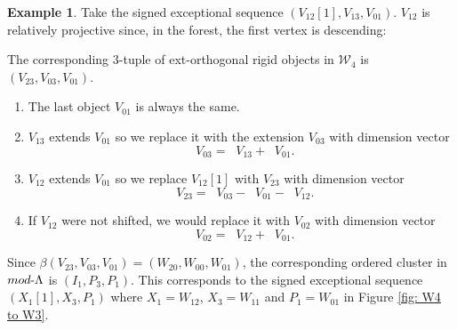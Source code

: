 \documentclass[11pt]{amsart}
\theoremstyle{definition}
\newtheorem{eg}[thm]{Example}
\theoremstyle{remark}
\numberwithin{equation}{section}
\DeclareMathOperator{\undim}{\underline{dim}}
\newcommand{\cW}{\ensuremath{{\mathcal{W}}}}
\begin{document}
\begin{eg}
Take the signed exceptional sequence $(V_{12}[1],V_{13},V_{01})$. $V_{12}$ is relatively projective since, in the forest, the first vertex is descending:
\begin{center}
\end{center}
The corresponding $3$-tuple of ext-orthogonal rigid objects in $\cW_4$ is $(V_{23},V_{03},V_{01})$.
\begin{enumerate}
\item The last object $V_{01}$ is always the same.
\item $V_{13}$ extends $V_{01}$ so we replace it with the extension $V_{03}$ with dimension vector
\[
	\undim V_{03}=\undim V_{13}+\undim V_{01}.
\]
\item $V_{12}$ extends $V_{01}$ so we replace $V_{12}[1]$ with $V_{23}$ with dimension vector
\[
	\undim V_{23}=\undim V_{03}-\undim V_{01}-\undim V_{12}.
\]
\item If $V_{12}$ were not shifted, we would replace it with $V_{02}$ with dimension vector
\[
	\undim V_{02}=\undim V_{12}+\undim V_{01}.
\]
\end{enumerate}
Since $\beta(V_{23},V_{03},V_{01})=(W_{20},W_{00},W_{01})$, the corresponding ordered cluster in $mod\text-\Lambda$ is $(I_1,P_3,P_1)$. This corresponds to the signed exceptional sequence $(X_1[1],X_3,P_1)$ where $X_1=W_{12}$, $X_3=W_{11}$ and $P_1=W_{01}$ in Figure \ref{fig: W4 to W3}.
\end{eg}
\end{document}
